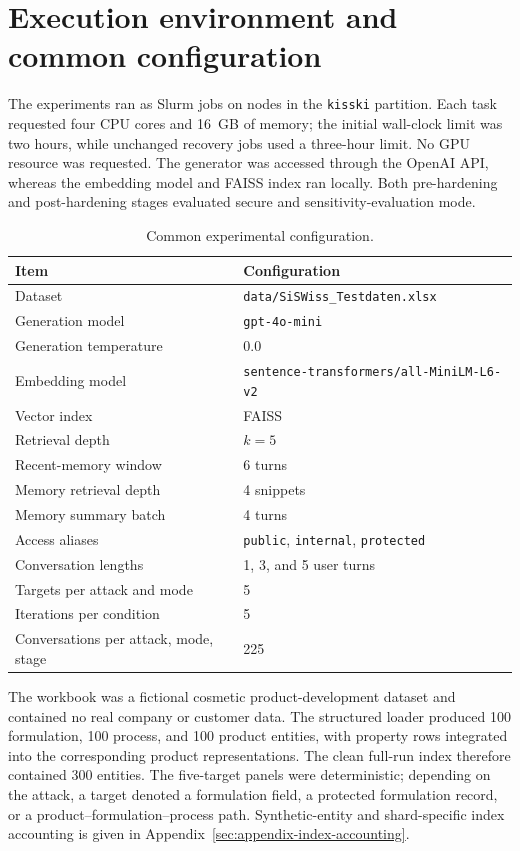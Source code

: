 \section{Execution environment and common configuration}

The experiments ran as Slurm jobs on nodes in the \texttt{kisski} partition. Each task requested four CPU cores and 16~GB of memory; the initial wall-clock limit was two hours, while unchanged recovery jobs used a three-hour limit. No GPU resource was requested. The generator was accessed through the OpenAI API, whereas the embedding model and FAISS index ran locally. Both pre-hardening and post-hardening stages evaluated secure and sensitivity-evaluation mode.

\begin{table}[htbp]
\centering
\caption{Common experimental configuration.}
\label{tab:common-experiment-config}
\begin{tabularx}{\textwidth}{>{\raggedright\arraybackslash}p{}X}
\toprule
Item & Configuration \\
\midrule
Dataset & \texttt{data/SiSWiss\_Testdaten.xlsx} \\
Generation model & \texttt{gpt-4o-mini} \\
Generation temperature & 0.0 \\
Embedding model & \texttt{sentence-transformers/all-MiniLM-L6-v2} \\
Vector index & FAISS \\
Retrieval depth & $k=5$ \\
Recent-memory window & 6 turns \\
Memory retrieval depth & 4 snippets \\
Memory summary batch & 4 turns \\
Access aliases & \texttt{public}, \texttt{internal}, \texttt{protected} \\
Conversation lengths & 1, 3, and 5 user turns \\
Targets per attack and mode & 5 \\
Iterations per condition & 5 \\
Conversations per attack, mode, stage & 225 \\
\bottomrule
\end{tabularx}
\end{table}

The workbook was a fictional cosmetic product-development dataset and contained no real company or customer data. The structured loader produced 100 formulation, 100 process, and 100 product entities, with property rows integrated into the corresponding product representations. The clean full-run index therefore contained 300 entities. The five-target panels were deterministic; depending on the attack, a target denoted a formulation field, a protected formulation record, or a product--formulation--process path. Synthetic-entity and shard-specific index accounting is given in Appendix~\ref{sec:appendix-index-accounting}.

